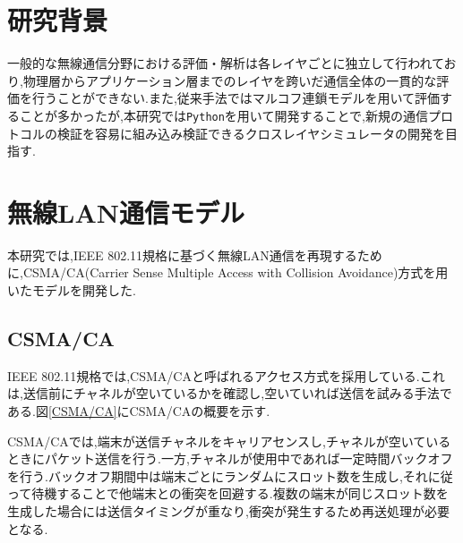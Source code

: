 \documentclass[a4paper, 10pt]{ltjsarticle}
\begin{document}
\section{研究背景}
一般的な無線通信分野における評価・解析は各レイヤごとに独立して行われており,物理層からアプリケーション層までのレイヤを跨いだ通信全体の一貫的な評価を行うことができない.また,従来手法ではマルコフ連鎖モデルを用いて評価することが多かったが,本研究では\texttt{Python}を用いて開発することで,新規の通信プロトコルの検証を容易に組み込み検証できるクロスレイヤシミュレータの開発を目指す.



\section{無線LAN通信モデル}

本研究では,IEEE 802.11規格に基づく無線LAN通信を再現するために,CSMA/CA(Carrier Sense Multiple Access with Collision Avoidance)方式を用いたモデルを開発した.

\subsection{CSMA/CA}

IEEE 802.11規格では,CSMA/CAと呼ばれるアクセス方式を採用している.これは,送信前にチャネルが空いているかを確認し,空いていれば送信を試みる手法である.図\ref{CSMA/CA}にCSMA/CAの概要を示す.

CSMA/CAでは,端末が送信チャネルをキャリアセンスし,チャネルが空いているときにパケット送信を行う.一方,チャネルが使用中であれば一定時間バックオフを行う.バックオフ期間中は端末ごとにランダムにスロット数を生成し,それに従って待機することで他端末との衝突を回避する.複数の端末が同じスロット数を生成した場合には送信タイミングが重なり,衝突が発生するため再送処理が必要となる.
\end{document}

